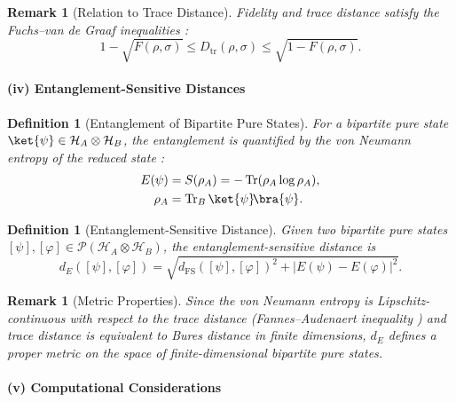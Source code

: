 \documentclass[aps,pra,reprint,nofootinbib,showpacs,superscriptaddress]{revtex4-1}
\newtheorem{definition}[theorem]{Definition}
\newtheorem{remark}[theorem]{Remark}
\newcommand{\Proj}{\mathcal{P}}
\begin{document}
\begin{remark}[Relation to Trace Distance]
Fidelity and trace distance satisfy the Fuchs--van de Graaf inequalities \cite{fuchs2002cryptographic}:
\[
1-\sqrt{F(\rho,\sigma)} \le D_{\mathrm{tr}}(\rho,\sigma) \le \sqrt{1-F(\rho,\sigma)}.
\]
\end{remark}


\paragraph{(iv) Entanglement-Sensitive Distances}

\begin{definition}[Entanglement of Bipartite Pure States]
For a bipartite pure state $\ket{\psi} \in \mathcal{H}_A \otimes \mathcal{H}_B$,
the \emph{entanglement} is quantified by the von Neumann entropy of the reduced state \cite{nielsen2010quantum}:
\begin{align}
E(\psi) &= S(\rho_A) = -\operatorname{Tr}(\rho_A \log \rho_A),
\nonumber \\
\rho_A &= \operatorname{Tr}_B \ket{\psi}\!\bra{\psi}.\nonumber 
\end{align}
\end{definition}

\begin{definition}[Entanglement-Sensitive Distance]
Given two bipartite pure states $[\psi],[\varphi] \in \Proj(\mathcal{H}_A \otimes \mathcal{H}_B)$,
the \emph{entanglement-sensitive distance} is
\[
d_E([\psi],[\varphi]) =
\sqrt{ d_{\mathrm{FS}}([\psi],[\varphi])^2 + |E(\psi)-E(\varphi)|^2 }.
\]
\end{definition}

\begin{remark}[Metric Properties]
Since the von Neumann entropy is Lipschitz-continuous with respect to the trace distance
(Fannes--Audenaert inequality \cite{fannes1973continuity,audenaert2007sharp}) and
trace distance is equivalent to Bures distance in finite dimensions,
$d_E$ defines a proper metric on the space of finite-dimensional bipartite pure states.
\end{remark}




\paragraph{(v) Computational Considerations}
\end{document}
